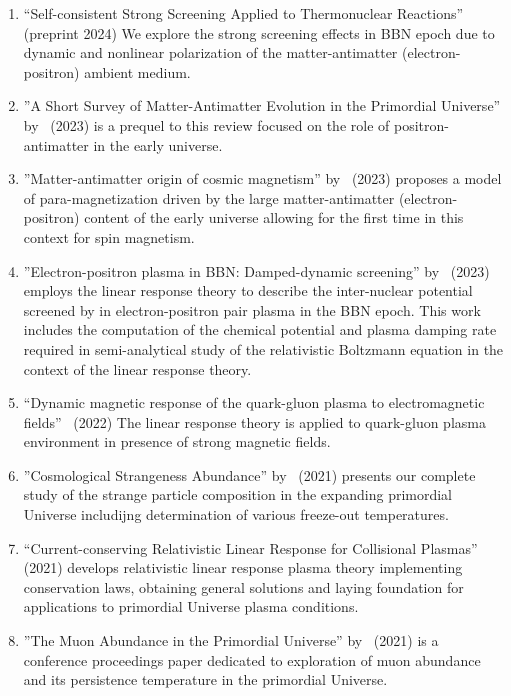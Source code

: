 \begin{enumerate}
\item {\small ``Self-consistent Strong Screening Applied to Thermonuclear Reactions''}~\cite{Grayson:2024uwg} (preprint 2024) We explore the strong screening effects in BBN epoch due to dynamic and nonlinear polarization of the matter-antimatter (electron-positron) ambient medium.
%
 \item ''A Short Survey of Matter-Antimatter Evolution in the Primordial 
Universe'' by~\cite{Rafelski:2023emw} (2023) is a prequel to this review  focused on the role of positron-antimatter in the early universe. 
%
\item ''Matter-antimatter origin of cosmic magnetism'' 
by~\cite{Steinmetz:2023nsc} (2023) proposes a model of para-magnetization driven by the large 
matter-antimatter (electron-positron) content of the early universe allowing for the first time in this context for spin magnetism.
%
\item ''Electron-positron plasma in BBN: Damped-dynamic screening'' by~\cite{Grayson:2023flr} (2023) employs the linear response theory to describe the inter-nuclear potential screened by in electron-positron pair plasma in the BBN epoch. This work includes the computation of the chemical potential and plasma damping rate required in semi-analytical study of the relativistic Boltzmann equation in the context of the linear response theory.  
%
\item ``Dynamic magnetic response of the quark-gluon plasma to electromagnetic fields''~\cite{Grayson:2022asf} (2022) The linear response theory is applied to quark-gluon plasma environment in presence of strong magnetic fields.
%
\item ''Cosmological Strangeness Abundance'' by~\cite{Yang:2021bko} (2021) presents our complete  study of the strange particle composition in the expanding primordial  Universe includijng determination of various  freeze-out temperatures.
%
\item ``Current-conserving Relativistic Linear Response for Collisional Plasmas''~\cite{Formanek:2021blc} (2021) develops relativistic linear response plasma theory implementing conservation laws, obtaining general solutions and laying foundation for applications to primordial Universe plasma conditions.
%
\item ''The Muon Abundance in the Primordial Universe'' by~\cite{Rafelski:2021aey} (2021) is a conference proceedings paper dedicated to exploration of  muon abundance and its persistence temperature in the primordial Universe. 

\end{enumerate}
